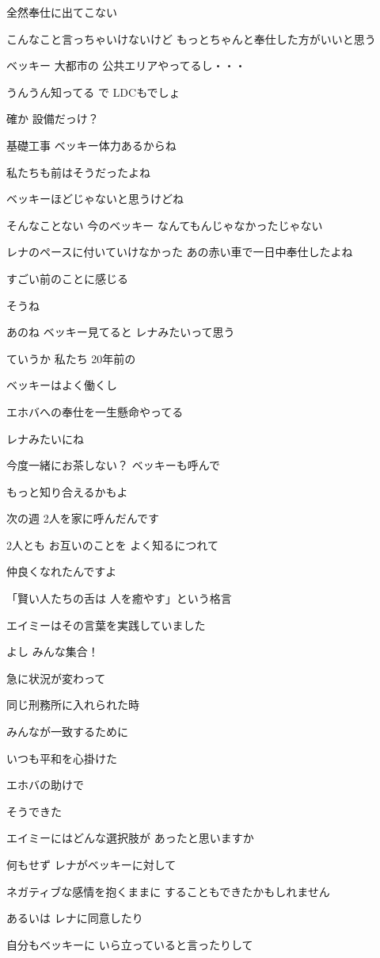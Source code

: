 \documentclass[twocolumn]{jsarticle}
\begin{document}
全然奉仕に出てこない

こんなこと言っちゃいけないけど
もっとちゃんと奉仕した方がいいと思う

ベッキー 大都市の
公共エリアやってるし・・・

うんうん知ってる で LDCもでしょ

確か 設備だっけ？

基礎工事 ベッキー体力あるからね

私たちも前はそうだったよね

ベッキーほどじゃないと思うけどね

そんなことない 今のベッキー
なんてもんじゃなかったじゃない

レナのペースに付いていけなかった
あの赤い車で一日中奉仕したよね

すごい前のことに感じる

そうね

あのね ベッキー見てると
レナみたいって思う

ていうか 私たち 20年前の

ベッキーはよく働くし

エホバへの奉仕を一生懸命やってる

レナみたいにね

今度一緒にお茶しない？
ベッキーも呼んで

もっと知り合えるかもよ

次の週 2人を家に呼んだんです

2人とも お互いのことを
よく知るにつれて

仲良くなれたんですよ

「賢い人たちの舌は
人を癒やす」という格言

エイミーはその言葉を実践していました

よし みんな集合！

急に状況が変わって

同じ刑務所に入れられた時

みんなが一致するために

いつも平和を心掛けた

エホバの助けで

そうできた

エイミーにはどんな選択肢が
あったと思いますか

何もせず レナがベッキーに対して

ネガティブな感情を抱くままに
することもできたかもしれません

あるいは レナに同意したり

自分もベッキーに
いら立っていると言ったりして
\end{document}
